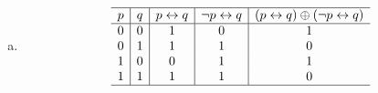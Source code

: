 {{\begin{practices}
\begin{enumerate}[a)]
{\begin{table}[H]
\[\begin{array}{c|c|c|c|c}
                                \hline
                                p & q & p \vee q & p \wedge q & (p \vee q) \oplus (p \wedge q)\\
                                \hline
                                0 & 0 & 0 & 0 & 0 \\
                                0 & 1 & 1 & 0 & 1 \\
                                1 & 0 & 1 & 0 & 1 \\
                                1 & 1 & 1 & 1 & 0 \\
                                \hline
                            \end{array}
                        \]
                    \end{table}
                }
                \item
                {
                    \begin{table}[H]
                        \[
                            \begin{array}{c|c|c|c|c}
                                \hline
                                p & q & p \leftrightarrow q & \neg p \leftrightarrow q & (p \leftrightarrow q) \oplus (\neg p \leftrightarrow q)\\
                                \hline
                                0 & 0 & 1 & 0 & 1 \\
                                0 & 1 & 1 & 1 & 0 \\
                                1 & 0 & 0 & 1 & 1 \\
                                1 & 1 & 1 & 1 & 0 \\
                                \hline
                            \end{array}
                        \]
                    \end{table}
                }
            \end{enumerate}
        \end{practices}
    }
}
